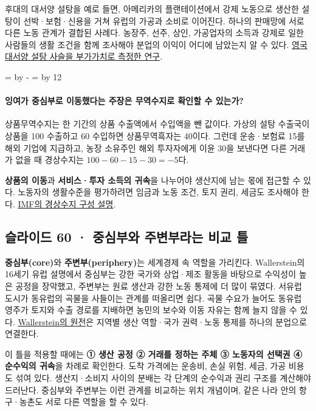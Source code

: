 \documentclass[10pt,a4paper]{article}
\newcommand{\ReserveQuestionSpace}{%
  \par\begingroup
  \dimen0=\pagegoal \advance\dimen0 by -\pagetotal
  \dimen2=\baselineskip \multiply\dimen2 by 12
  \ifdim\dimen0<\dimen2 \newpage\fi
  \endgroup}
\begin{document}
후대의 대서양 설탕을 예로 들면, 아메리카의 플랜테이션에서 강제 노동으로 생산한 설탕이 선박·보험·신용을 거쳐 유럽의 가공과 소비로 이어진다. 하나의 판매망에 서로 다른 노동 관계가 결합된 사례다. 농장주, 선주, 상인, 가공업자의 소득과 강제로 일한 사람들의 생활 조건을 함께 조사해야 분업의 이익이 어디에 남았는지 알 수 있다. \href{https://www.cambridge.org/core/journals/journal-of-global-history/article/on-the-economic-importance-of-the-slave-plantation-complex-to-the-british-economy-during-the-eighteenth-century-a-valueadded-approach/DBB1225FF928C09689B3EEFCA8F66C55}{영국 대서양 설탕 사슬을 부가가치로 측정한 연구}.\par

\ReserveQuestionSpace
\paragraph{잉여가 중심부로 이동했다는 주장은 무역수지로 확인할 수 있는가?}
상품무역수지는 한 기간의 상품 수출액에서 수입액을 뺀 값이다. 가상의 설탕 수출국이 상품을 100 수출하고 60 수입하면 상품무역흑자는 40이다. 그런데 운송·보험료 15를 해외 기업에 지급하고, 농장 소유주인 해외 투자자에게 이윤 30을 보낸다면 다른 거래가 없을 때 경상수지는 $100-60-15-30=-5$다.\par

\textbf{상품의 이동}과 \textbf{서비스·투자 소득의 귀속}을 나누어야 생산지에 남는 몫에 접근할 수 있다. 노동자의 생활수준을 평가하려면 임금과 노동 조건, 토지 권리, 세금도 조사해야 한다. \href{https://www.imf.org/en/publications/fandd/issues/series/back-to-basics/current-account-deficits}{IMF의 경상수지 구성 설명}.\par

\subsection{슬라이드 60 · 중심부와 주변부라는 비교 틀}
\textbf{중심부(core)}와 \textbf{주변부(periphery)}는 세계경제 속 역할을 가리킨다. Wallerstein의 16세기 유럽 설명에서 중심부는 강한 국가와 상업·제조 활동을 바탕으로 수익성이 높은 공정을 장악했고, 주변부는 원료 생산과 강한 노동 통제에 더 많이 묶였다. 서유럽 도시가 동유럽의 곡물을 사들이는 관계를 떠올리면 쉽다. 곡물 수요가 늘어도 동유럽 영주가 토지와 수출 경로를 지배하면 농민의 보수와 이동 자유는 함께 늘지 않을 수 있다. \href{https://www.csub.edu/\%7Egsantos/WORLDSYS.HTML}{Wallerstein의 원전}은 지역별 생산 역할·국가 권력·노동 통제를 하나의 분업으로 연결한다.\par

이 틀을 적용할 때에는 \textbf{① 생산 공정 ② 거래를 정하는 주체 ③ 노동자의 선택권 ④ 순수익의 귀속}을 차례로 확인한다. 도착 가격에는 운송비, 손실 위험, 세금, 가공 비용도 섞여 있다. 생산지·소비지 사이의 분배는 각 단계의 순수익과 권리 구조를 계산해야 드러난다. 중심부와 주변부는 이런 관계를 비교하는 위치 개념이며, 같은 나라 안의 항구·농촌도 서로 다른 역할을 할 수 있다.\par
\end{document}
